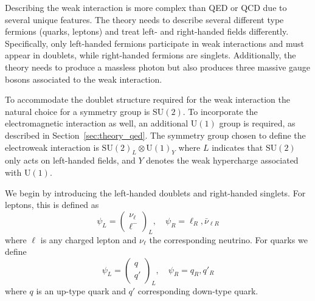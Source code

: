 Describing the weak interaction is more complex than QED or QCD due to several unique features. The theory needs to describe several different type fermions (quarks, leptons) and treat left- and right-handed fields differently. Specifically, only left-handed fermions participate in weak interactions and must appear in doublets, while right-handed fermions are singlets. Additionally, the theory needs to produce a massless photon but also produces three massive gauge bosons associated to the weak interaction. 

To accommodate the doublet structure required for the weak interaction the natural choice for a symmetry group is $\mathrm{SU}(2)$. To incorporate the electromagnetic interaction as well, an additional $\mathrm{U}(1)$ group is required, as described in Section~\ref{sec:theory_qed}. The symmetry group chosen to define the electroweak interaction is $\mathrm{SU}{(2)}_{L} \otimes \mathrm{U}{(1)}_{Y}$ where $L$ indicates that $\mathrm{SU}(2)$ only acts on left-handed fields, and $Y$ denotes the weak hypercharge associated with $\mathrm{U}(1)$. 

We begin by introducing the left-handed doublets and right-handed singlets. For leptons, this is defined as
\begin{equation}
  \psi_{L} = \begin{pmatrix}
    \nu_{\ell} \\
    \ell^{-}
  \end{pmatrix}_{L}, \quad
  \psi_{R} = \ell_{R}, \bar{\nu}_{\ell R}
  \label{eq:ew_lepton_fields}
\end{equation}
where $\ell$ is any charged lepton and $\nu_{\ell}$ the corresponding neutrino. For quarks we define
\begin{equation}
  \psi_{L} = \begin{pmatrix}
    q \\
    q'
  \end{pmatrix}_{L}, \quad
  \psi_{R} = q_{R}, q'_{R}
  \label{eq:ew_quark_fields}
\end{equation}
where $q$ is an up-type quark and $q'$ corresponding down-type quark. 

